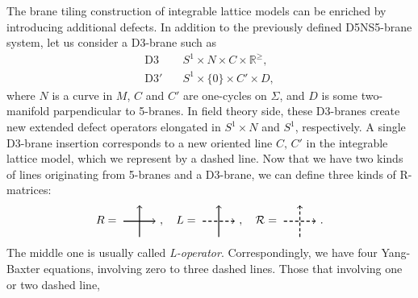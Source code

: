 The brane tiling construction of integrable lattice models can be
enriched by introducing additional defects. In addition to the previously
defined D5NS5-brane system, let us consider a D3-brane such as
\begin{align}
  \mathrm{D3}    &  \quad S^{1}  \times  N  \times  C  \times  \mathbb{R}^{\geq}, \label{eq:D3}\\
  \mathrm{D3'}   &  \quad S^{1}  \times \{ 0\}  \times  C'  \times  D, \label{eq:D3'}
\end{align}
where $N$ is a curve in $M$, $C$ and $C'$ are one-cycles on $\Sigma$,
and $D$ is some two-manifold parpendicular to 5-branes.
In field theory side, these D3-branes create new extended defect operators
elongated in $S^1\times N$ and $S^1$, respectively.
A single D3-brane insertion corresponds to a new oriented line $C,\,C'$ in
the integrable lattice model, which we represent by a dashed line.
Now that we have two kinds of lines originating from 5-branes and a D3-brane,
we can define three kinds of R-matrices:
\begin{equation}
  R=
    \begin{tikzpicture}[scale=0.5, baseline=(x.base)]
        \node (x) at (0,0) {\vphantom{x}};

        \draw[thick, ->] (0,0) -- (2,0);
        \draw[thick, ->] (1,-1) -- (1,1);

    \end{tikzpicture}
  ~ ,
  \quad
  L=
    \begin{tikzpicture}[scale=0.5, baseline=(x.base)]
        \node (x) at (0,0) {\vphantom{x}};

        \draw[thick, densely dashed, ->] (0,0) -- (2,0);
        \draw[thick, ->] (1,-1) -- (1,1);

    \end{tikzpicture}
  ~ ,
  \quad
  \mathcal{R}=
    \begin{tikzpicture}[scale=0.5, baseline=(x.base)]
        \node (x) at (0,0) {\vphantom{x}};

        \draw[thick, densely dashed, ->] (0,0) -- (2,0);
        \draw[thick, densely dashed, ->] (1,-1) -- (1,1);

    \end{tikzpicture}
  ~ .
\end{equation}
The middle one is usually called \emph{L-operator}. Correspondingly,
we have four Yang-Baxter equations, involving zero to three dashed
lines. Those that involving one or two dashed line,
